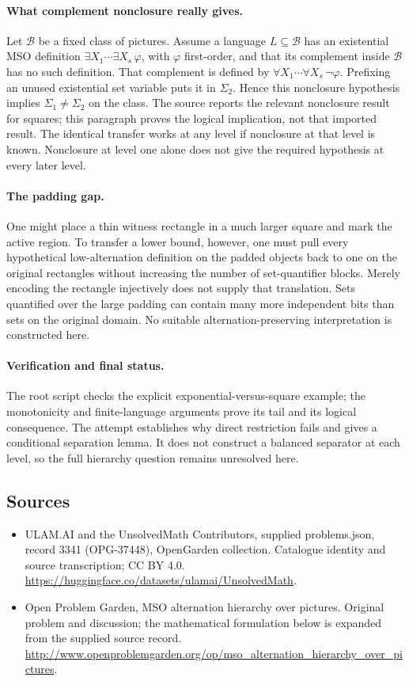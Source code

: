 \documentclass[11pt,a4paper]{article}
\begin{document}
\paragraph{What complement nonclosure really gives.}
Let $\mathcal B$ be a fixed class of pictures. Assume a
language $L\subseteq\mathcal B$ has an existential MSO
definition $\exists X_1\cdots\exists X_s\,\varphi$, with
$\varphi$ first-order, and that its complement inside
$\mathcal B$ has no such definition. That complement
is defined by $\forall X_1\cdots\forall X_s\,\neg\varphi$.
Prefixing an unused existential set variable puts it in
$\Sigma_2$. Hence this nonclosure hypothesis implies
$\Sigma_1\ne\Sigma_2$ on the class. The source reports
the relevant nonclosure result for squares; this paragraph
proves the logical implication, not that imported result.
The identical transfer works at any level if nonclosure
at that level is known. Nonclosure at level one alone
does not give the required hypothesis at every later level.

\paragraph{The padding gap.}
One might place a thin witness rectangle in a much larger
square and mark the active region. To transfer a lower
bound, however, one must pull every hypothetical
low-alternation definition on the padded objects back
to one on the original rectangles without increasing
the number of set-quantifier blocks. Merely encoding
the rectangle injectively does not supply that translation.
Sets quantified over the large padding can contain many
more independent bits than sets on the original domain.
No suitable alternation-preserving interpretation is
constructed here.

\paragraph{Verification and final status.}
The root script checks the explicit exponential-versus-square
example; the monotonicity and finite-language arguments
prove its tail and its logical consequence. The attempt
establishes why direct restriction fails and gives a
conditional separation lemma. It does not construct a
balanced separator at each level, so the full hierarchy
question remains unresolved here.

\subsection{Sources}
\begin{itemize}
\item[S1] ULAM.AI and the UnsolvedMath Contributors, supplied problems.json, record 3341 (OPG-37448), OpenGarden collection. Catalogue identity and source transcription; CC BY 4.0.
\url{https://huggingface.co/datasets/ulamai/UnsolvedMath}.
\item[S2] Open Problem Garden, MSO alternation hierarchy over pictures. Original problem and discussion; the mathematical formulation below is expanded from the supplied source record.
\url{http://www.openproblemgarden.org/op/mso_alternation_hierarchy_over_pictures}.

\end{itemize}
\end{document}
